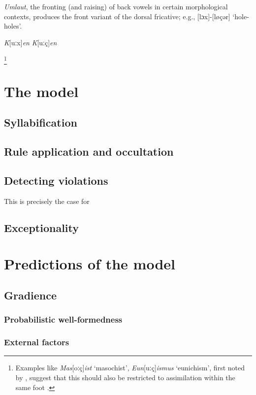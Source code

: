 \emph{Umlaut}, the fronting (and raising) of back vowels in certain morphological contexts, produces the front variant of the dorsal fricative; e.g., [lɔx]-[løçər] `hole-holes'.

\emph{K}[uːx]\emph{en}
\emph{K}[uːç]\emph{en}

\footnote{Examples like \emph{Mas}[oːç]\emph{ist} `masochist', \emph{Eun}[uːç]\emph{ismus} `eunichism', first noted by \citet{Merchant1994}, suggest that this should also be restricted to assimilation within the same foot \citep[226f.]{Jensen2000}.}

\section{The model}

\subsection{Syllabification}

\subsection{Rule application and occultation}

\subsection{Detecting violations}

This is precisely the case for 

\subsection{Exceptionality}

\section{Predictions of the model}

\subsection{Gradience}
\subsubsection{Probabilistic well-formedness}
\subsubsection{External factors}

